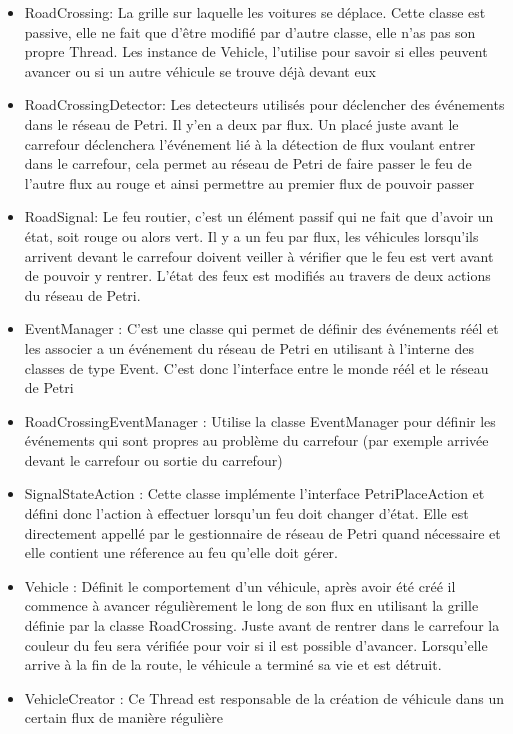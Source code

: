 \documentclass[11pt,a4paper, openany]{memoir}
\begin{document}
\begin{itemize}
\item RoadCrossing: La grille sur laquelle les voitures se déplace. Cette classe est passive, elle ne fait que d'être modifié par d'autre classe, elle n'as pas son propre Thread. Les instance de Vehicle, l'utilise pour savoir si elles peuvent avancer ou si un autre véhicule se trouve déjà devant eux
\item RoadCrossingDetector: Les detecteurs utilisés pour déclencher des événements dans le réseau de Petri. Il y'en a deux par flux. Un placé juste avant le carrefour déclenchera l'événement lié à la détection de flux voulant entrer dans le carrefour, cela permet au réseau de Petri de faire passer le feu de l'autre flux au rouge et ainsi permettre au premier flux de pouvoir passer
\item RoadSignal: Le feu routier, c'est un élément passif qui ne fait que d'avoir un état, soit rouge ou alors vert. Il y a un feu par flux, les véhicules lorsqu'ils arrivent devant le carrefour doivent veiller à vérifier que le feu est vert avant de pouvoir y rentrer. L'état des feux est modifiés au travers de deux actions du réseau de Petri.
\item EventManager : C'est une classe qui permet de définir des événements réél et les associer a un événement du réseau de Petri en utilisant à l'interne des classes de type Event. C'est donc l'interface entre le monde réél et le réseau de Petri
\item RoadCrossingEventManager : Utilise la classe EventManager pour définir les événements qui sont propres au problème du carrefour (par exemple arrivée devant le carrefour ou sortie du carrefour)
\item SignalStateAction : Cette classe implémente l'interface PetriPlaceAction et défini donc l'action à effectuer lorsqu'un feu doit changer d'état. Elle est directement appellé par le gestionnaire de réseau de Petri quand nécessaire et elle contient une réference au feu qu'elle doit gérer.
\item Vehicle : Définit le comportement d'un véhicule, après avoir été créé il commence à avancer régulièrement le long de son flux en utilisant la grille définie par la classe RoadCrossing. Juste avant de rentrer dans le carrefour la couleur du feu sera vérifiée pour voir si il est possible d'avancer. Lorsqu'elle arrive à la fin de la route, le véhicule a terminé sa vie et est détruit.
\item VehicleCreator : Ce Thread est responsable de la création de véhicule dans un certain flux de manière régulière

\end{itemize}
\end{document}
